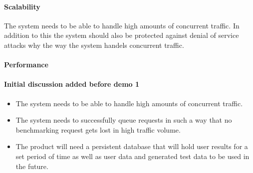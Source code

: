 \paragraph{Scalability}
The system needs to be able to handle high amounts of concurrent traffic.
In addition to this the system should also be protected against
denial of service attacks why the way the system handels concurrent traffic.

\paragraph{Performance}

\paragraph{Initial discussion added before demo 1}
\begin{itemize}
 \item The system needs to be able to handle high amounts of concurrent traffic.
 \item The system needs to successfully queue requests in such a way that no
	   benchmarking request gets lost in high traffic volume.
 \item The product will need a persistent database that will hold user results
       for a set period of time as well as user data and generated test data to
       be used in the future. 
\end{itemize}
